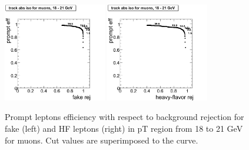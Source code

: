 \begin{figure}[htbp]
\begin{center}
 \includegraphics[width = 0.4\textwidth]{pictures/bkgdRej_sigEff/onlyTrack_muon_fake_ptCut5_ptCut6.png}
\includegraphics[width = 0.4\textwidth]{pictures/bkgdRej_sigEff/onlyTrack_muon_nonPrompt_ptCut5_ptCut6.png}
\caption{\small{Prompt leptons efficiency with respect to background 
rejection for fake (left) and HF leptons (right) in pT region
from 18 to 21 GeV for muons. 
Cut values are superimposed to the curve.}\label{fig:rej_mu6}}
\end{center}
\end{figure}

